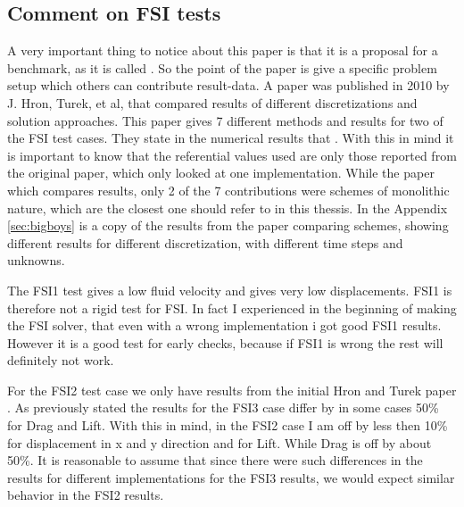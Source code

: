 \subsection*{Comment on FSI tests}
 A very important thing to notice about this paper \cite{Hron2006a} is that it is a proposal for a benchmark, as it is called . So the point of the paper is give a specific problem setup which others can contribute result-data. A paper was published in 2010 by J. Hron, Turek, et al, \cite{Turek2010} that compared results of different discretizations and solution approaches. This paper \cite{Turek2010} gives 7 different methods and results for two of the FSI test cases. They state in the numerical results that . With this in mind it is important to know that the referential values used are only those reported from the original paper, which only looked at one implementation. While the paper which compares results, only 2 of the 7 contributions were schemes of monolithic nature, which are the closest one should refer to in this thessis.  In the Appendix \ref{sec:bigboys} is a copy of the results from the paper comparing schemes, showing different results for different discretization, with different time steps and unknowns. 


The FSI1 test gives a low fluid velocity and gives very low displacements. FSI1 is therefore not a rigid test for FSI. In fact I experienced in the beginning of making the FSI solver, that even with a wrong implementation i got good FSI1 results. However it is a good test for early checks, because if FSI1 is wrong the rest will definitely not work.  \newline

For the FSI2 test case we only have results from the initial Hron and Turek paper \cite{Hron2006a}. As previously stated the results for the FSI3 case differ by in some cases 50\% for Drag and Lift. With this in mind, in the FSI2 case I am off by less then 10\% for displacement in x and y direction and for Lift. While Drag is off by about  50\%. It is reasonable to assume that since there were such differences in the results for different implementations for the FSI3 results, we would expect similar behavior in the FSI2 results.

